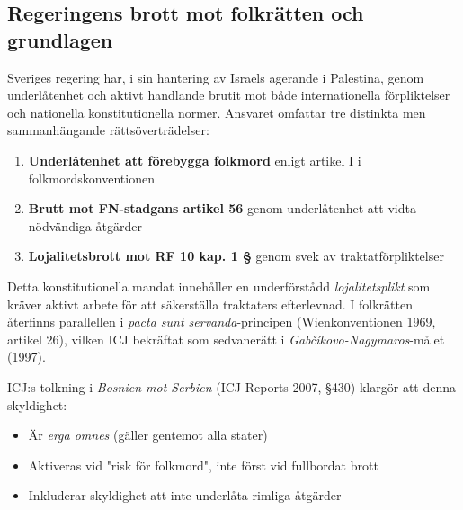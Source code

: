 
\subsection{Regeringens brott mot folkrätten och grundlagen}

Sveriges regering har, i sin hantering av Israels agerande i Palestina, genom underlåtenhet och aktivt handlande brutit mot både internationella förpliktelser och nationella konstitutionella normer. Ansvaret omfattar tre distinkta men sammanhängande rättsöverträdelser:

\begin{enumerate}
    \item \textbf{Underlåtenhet att förebygga folkmord} enligt artikel I i folkmordskonventionen
    \item \textbf{Brutt mot FN-stadgans artikel 56} genom underlåtenhet att vidta nödvändiga åtgärder
    \item \textbf{Lojalitetsbrott mot RF 10 kap. 1 §} genom svek av traktatförpliktelser
\end{enumerate}


Detta konstitutionella mandat innehåller en underförstådd \textit{lojalitetsplikt} som kräver aktivt arbete för att säkerställa traktaters efterlevnad. I folkrätten återfinns parallellen i \textit{pacta sunt servanda}-principen (Wienkonventionen 1969, artikel 26), vilken ICJ bekräftat som sedvanerätt i \textit{Gabčíkovo-Nagymaros}-målet (1997).


ICJ:s tolkning i \textit{Bosnien mot Serbien} (ICJ Reports 2007, §430) klargör att denna skyldighet:
\begin{itemize}
    \item Är \textit{erga omnes} (gäller gentemot alla stater)
    \item Aktiveras vid "risk för folkmord", inte först vid fullbordat brott
    \item Inkluderar skyldighet att inte underlåta rimliga åtgärder
\end{itemize}

